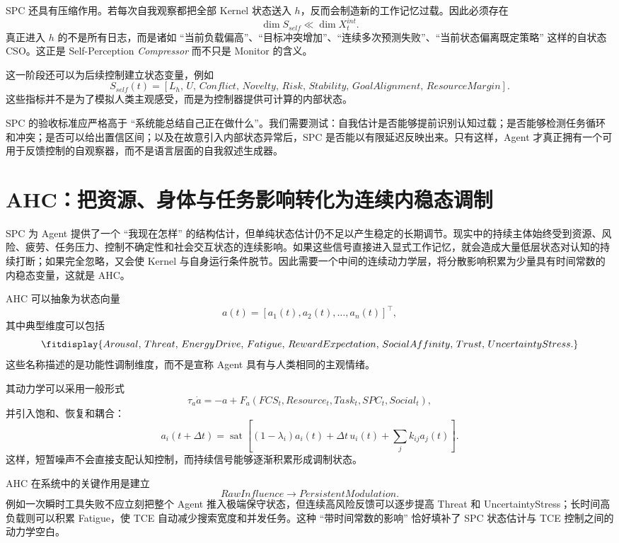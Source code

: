 SPC 还具有压缩作用。若每次自我观察都把全部 Kernel 状态送入 $h$，反而会制造新的工作记忆过载。因此必须存在
\[
\dim S_{self}
\ll
\dim X_t^{int}.
\]
真正进入 $h$ 的不是所有日志，而是诸如 ``当前负载偏高''、``目标冲突增加''、``连续多次预测失败''、``当前状态偏离既定策略'' 这样的自状态 CSO。这正是 Self-Perception \emph{Compressor} 而不只是 Monitor 的含义。

这一阶段还可以为后续控制建立状态变量，例如
\[
S_{self}(t)
=
[
L_h,\,
U,\,
Conflict,\,
Novelty,\,
Risk,\,
Stability,\,
GoalAlignment,\,
ResourceMargin
].
\]
这些指标并不是为了模拟人类主观感受，而是为控制器提供可计算的内部状态。

SPC 的验收标准应严格高于 ``系统能总结自己正在做什么''。我们需要测试：自我估计是否能够提前识别认知过载；是否能够检测任务循环和冲突；是否可以给出置信区间；以及在故意引入内部状态异常后，SPC 是否能以有限延迟反映出来。只有这样，Agent 才真正拥有一个可用于反馈控制的自观察器，而不是语言层面的自我叙述生成器。

\section{AHC：把资源、身体与任务影响转化为连续内稳态调制}

SPC 为 Agent 提供了一个 ``我现在怎样'' 的结构估计，但单纯状态估计仍不足以产生稳定的长期调节。现实中的持续主体始终受到资源、风险、疲劳、任务压力、控制不确定性和社会交互状态的连续影响。如果这些信号直接进入显式工作记忆，就会造成大量低层状态对认知的持续打断；如果完全忽略，又会使 Kernel 与自身运行条件脱节。因此需要一个中间的连续动力学层，将分散影响积累为少量具有时间常数的内稳态变量，这就是 AHC。

AHC 可以抽象为状态向量
\[
a(t)
=
[
a_1(t),a_2(t),\ldots,a_n(t)
]^\top,
\]
其中典型维度可以包括
\[
\fitdisplay{
Arousal,\,
Threat,\,
EnergyDrive,\,
Fatigue,\,
RewardExpectation,\,
SocialAffinity,\,
Trust,\,
UncertaintyStress.
}
\]
这些名称描述的是功能性调制维度，而不是宣称 Agent 具有与人类相同的主观情绪。

其动力学可以采用一般形式
\[
\tau_a\dot a
=
-a
+
F_a(
FCS_t,
Resource_t,
Task_t,
SPC_t,
Social_t
),
\]
并引入饱和、恢复和耦合：
\[
a_i(t+\Delta t)
=
\operatorname{sat}
\left[
(1-\lambda_i)a_i(t)
+
\Delta t\,u_i(t)
+
\sum_j k_{ij}a_j(t)
\right].
\]
这样，短暂噪声不会直接支配认知控制，而持续信号能够逐渐积累形成调制状态。

AHC 在系统中的关键作用是建立
\[
RawInfluence
\rightarrow
PersistentModulation.
\]
例如一次瞬时工具失败不应立刻把整个 Agent 推入极端保守状态，但连续高风险反馈可以逐步提高 Threat 和 UncertaintyStress；长时间高负载则可以积累 Fatigue，使 TCE 自动减少搜索宽度和并发任务。这种 ``带时间常数的影响'' 恰好填补了 SPC 状态估计与 TCE 控制之间的动力学空白。

